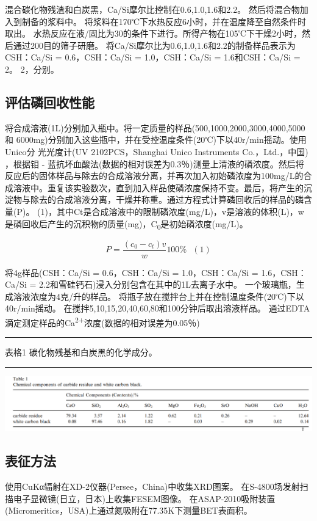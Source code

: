 \documentclass[11pt]{article}
\begin{document}
混合碳化物残渣和白炭黑，Ca/Si摩尔比控制在0.6,1.0,1.6和2.2。 然后将混合物加入到制备的浆料中。 将浆料在170℃下水热反应6小时，并在温度降至自然条件时取出。 水热反应在液/固比为30的条件下进行。所得产物在105℃下干燥2小时，然后通过200目的筛子研磨。 将Ca/Si摩尔比为0.6,1.0,1.6和2.2的制备样品表示为CSH：Ca/Si = 0.6，CSH：Ca/Si = 1.0，CSH：Ca/Si = 1.6和CSH：Ca/Si = 2。 2，分别。
\subsection{评估磷回收性能}
\label{sec:org4216069}
将合成溶液(1L)分别加入瓶中。将一定质量的样品(500,1000,2000,3000,4000,5000和
6000mg)分别加入这些瓶中，并在受控温度条件(20℃)下以40r/min摇动。使用Unico分
光光度计(UV 2102PCS，Shanghai Unico Instruments Co.，Ltd.，中国)
\cite{gustafsson08_phosp_remov_by_miner_based} ，根据钼 - 蓝抗坏血酸法(数据的相对误差为0.3％)测量上清液的磷浓度。然后将反应后的固体样品与除去的合成溶液分离，并再次加入初始磷浓度为100mg/L的合成溶液中。重复该实验数次，直到加入样品使磷浓度保持不变。最后，将产生的沉淀物与除去的合成溶液分离，干燥并称重。通过方程式计算磷回收后的样品的磷含量(P)。 (1)，其中Ct是合成溶液中的限制磷浓度(mg/L)，v是溶液的体积(L)，w是磷回收后产生的沉积物的质量(mg)，C\textsubscript{0}是初始磷浓度(mg/L)。

\[P = \frac{(c_{0} - c_{t})v}{w} 100\% \ \ \  (1)\]

将4g样品(CSH：Ca/Si = 0.6，CSH：Ca/Si = 1.0，CSH：Ca/Si = 1.6，CSH：Ca/Si = 2.2和雪硅钙石)浸入分别包含在其中的1L去离子水中。 一个玻璃瓶，生成溶液浓度为4克/升的样品。 将瓶子放在搅拌台上并在控制温度条件(20℃)下以40r/min摇动。 在搅拌5,10,15,20,40,60,80和100分钟后取出溶液样品。 通过EDTA滴定测定样品的Ca\textsuperscript{2+}浓度(数据的相对误差为0.05％)\cite{kim03_effec_ph_sulfat_sodium_edta_titrat_calcium}

\noindent\rule{\textwidth}{0.5pt}
表格1
碳化物残基和白炭黑的化学成分。

\noindent\rule{\textwidth}{0.5pt}

\includegraphics[scale=0.3]{table1.png}

\subsection{表征方法}
\label{sec:org5d674b0}
使用CuKα辐射在XD-2仪器(Persee，China)中收集XRD图案。 在S-4800场发射扫描电子显微镜(日立，日本)上收集FESEM图像。 在ASAP-2010吸附装置(Micromeritics，USA)上通过氮吸附在77.35K下测量BET表面积。
\end{document}
